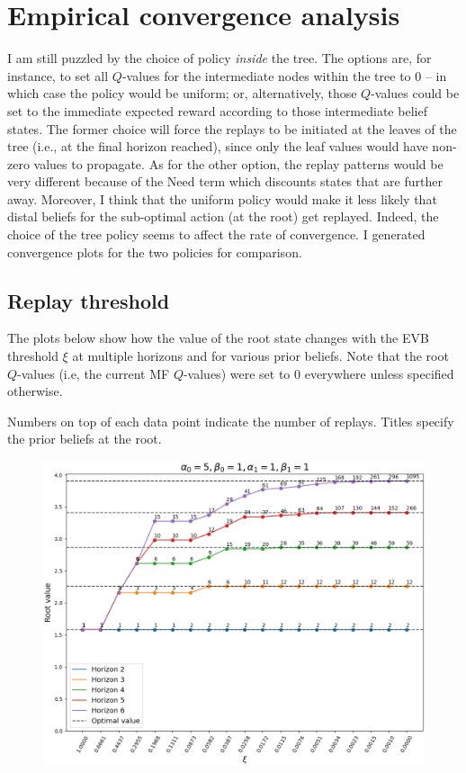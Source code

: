 \documentclass{article}
\begin{document}
\section*{Empirical convergence analysis}

I am still puzzled by the choice of policy \textit{inside} the tree. The options are, for instance, to set all 
$Q$-values for the intermediate nodes within the tree to $0$ -- in which case the policy would be uniform; or, 
alternatively, those $Q$-values could be set to the immediate expected reward according to those intermediate 
belief states. The former choice will force the replays to be initiated at the leaves of the tree (i.e., at the 
final horizon reached), since only the leaf values would have non-zero values to propagate. As for the other 
option, the replay patterns would be very different because of the Need term which discounts states that are further away.     
\bigbreak
Moreover, I think that the uniform policy would make it less likely that distal beliefs for the sub-optimal action (at 
the root) get replayed. Indeed, the choice of the tree policy seems to affect the rate of convergence. I generated 
convergence plots for the two policies for comparison. 

\subsection*{Replay threshold}
The plots below show how the value of the root state changes with the EVB threshold $\xi$ at multiple horizons 
and for various prior beliefs. Note that the root $Q$-values (i.e, the current MF $Q$-values) were set to $0$ 
everywhere unless specified otherwise.

\bigbreak
Numbers on top of each data point indicate the number of replays. Titles specify the prior beliefs at the root.

\newpage

\begin{figure}[h!]
    \centering
    \includegraphics[width=.75\textwidth]{../data/convergence/xi/alpha05_beta01_alpha11_beta11.png}
\end{figure}
\end{document}
